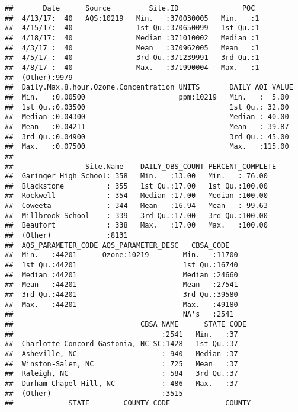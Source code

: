 \documentclass[]{article}
\begin{document}
\begin{verbatim}
##       Date      Source         Site.ID               POC   
##  4/13/17:  40   AQS:10219   Min.   :370030005   Min.   :1  
##  4/15/17:  40               1st Qu.:370650099   1st Qu.:1  
##  4/18/17:  40               Median :371010002   Median :1  
##  4/3/17 :  40               Mean   :370962005   Mean   :1  
##  4/5/17 :  40               3rd Qu.:371239991   3rd Qu.:1  
##  4/8/17 :  40               Max.   :371990004   Max.   :1  
##  (Other):9979                                              
##  Daily.Max.8.hour.Ozone.Concentration UNITS       DAILY_AQI_VALUE 
##  Min.   :0.00500                      ppm:10219   Min.   :  5.00  
##  1st Qu.:0.03500                                  1st Qu.: 32.00  
##  Median :0.04300                                  Median : 40.00  
##  Mean   :0.04211                                  Mean   : 39.87  
##  3rd Qu.:0.04900                                  3rd Qu.: 45.00  
##  Max.   :0.07500                                  Max.   :115.00  
##                                                                   
##                 Site.Name    DAILY_OBS_COUNT PERCENT_COMPLETE
##  Garinger High School: 358   Min.   :13.00   Min.   : 76.00  
##  Blackstone          : 355   1st Qu.:17.00   1st Qu.:100.00  
##  Rockwell            : 354   Median :17.00   Median :100.00  
##  Coweeta             : 344   Mean   :16.94   Mean   : 99.63  
##  Millbrook School    : 339   3rd Qu.:17.00   3rd Qu.:100.00  
##  Beaufort            : 338   Max.   :17.00   Max.   :100.00  
##  (Other)             :8131                                   
##  AQS_PARAMETER_CODE AQS_PARAMETER_DESC   CBSA_CODE    
##  Min.   :44201      Ozone:10219        Min.   :11700  
##  1st Qu.:44201                         1st Qu.:16740  
##  Median :44201                         Median :24660  
##  Mean   :44201                         Mean   :27541  
##  3rd Qu.:44201                         3rd Qu.:39580  
##  Max.   :44201                         Max.   :49180  
##                                        NA's   :2541   
##                              CBSA_NAME      STATE_CODE
##                                   :2541   Min.   :37  
##  Charlotte-Concord-Gastonia, NC-SC:1428   1st Qu.:37  
##  Asheville, NC                    : 940   Median :37  
##  Winston-Salem, NC                : 725   Mean   :37  
##  Raleigh, NC                      : 584   3rd Qu.:37  
##  Durham-Chapel Hill, NC           : 486   Max.   :37  
##  (Other)                          :3515               
##             STATE        COUNTY_CODE             COUNTY    

\end{verbatim}
\end{document}
